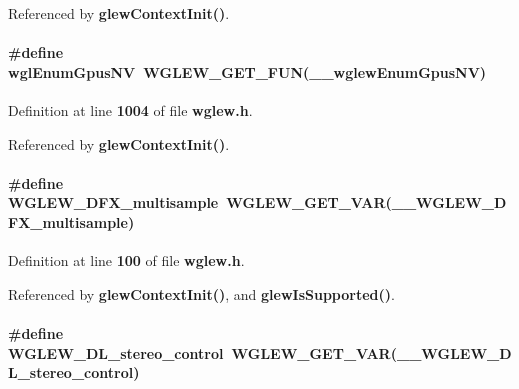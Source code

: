Referenced by {\bf glew\+Context\+Init()}.

\paragraph[{wgl\+Enum\+Gpus\+NV}]{\setlength{\rightskip}{0pt plus 5cm}\#define wgl\+Enum\+Gpus\+NV~{\bf W\+G\+L\+E\+W\+\_\+\+G\+E\+T\+\_\+\+F\+UN}({\bf \+\_\+\+\_\+wglew\+Enum\+Gpus\+NV})}\label{wglew_8h_ac53d6bf4dfa4cf2a9c9bcc26b622ac22}


Definition at line {\bf 1004} of file {\bf wglew.\+h}.



Referenced by {\bf glew\+Context\+Init()}.

\paragraph[{W\+G\+L\+E\+W\+\_\+3\+D\+F\+X\+\_\+multisample}]{\setlength{\rightskip}{0pt plus 5cm}\#define W\+G\+L\+E\+W\+\_\+D\+F\+X\+\_\+multisample~{\bf W\+G\+L\+E\+W\+\_\+\+G\+E\+T\+\_\+\+V\+AR}({\bf \+\_\+\+\_\+\+W\+G\+L\+E\+W\+\_\+D\+F\+X\+\_\+multisample})}\label{wglew_8h_adb8c7c298996ba0b878bbec1f42c2939}


Definition at line {\bf 100} of file {\bf wglew.\+h}.



Referenced by {\bf glew\+Context\+Init()}, and {\bf glew\+Is\+Supported()}.

\paragraph[{W\+G\+L\+E\+W\+\_\+3\+D\+L\+\_\+stereo\+\_\+control}]{\setlength{\rightskip}{0pt plus 5cm}\#define W\+G\+L\+E\+W\+\_\+D\+L\+\_\+stereo\+\_\+control~{\bf W\+G\+L\+E\+W\+\_\+\+G\+E\+T\+\_\+\+V\+AR}({\bf \+\_\+\+\_\+\+W\+G\+L\+E\+W\+\_\+D\+L\+\_\+stereo\+\_\+control})}\label{wglew_8h_a0db30101726ed3b4f2fbc189fb18f22a}


